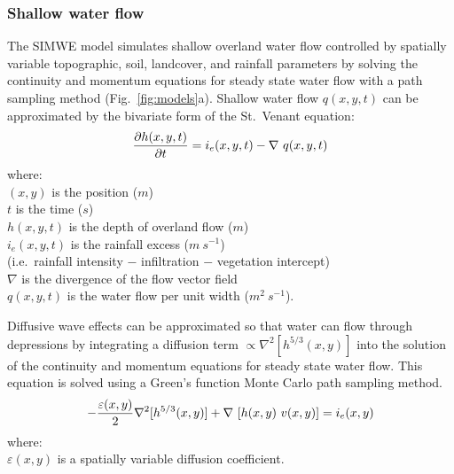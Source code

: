 \documentclass[esurf, manuscript]{copernicus}
\begin{document}

\subsubsection{Shallow water flow}

The SIMWE model
simulates shallow overland water flow
controlled by spatially variable topographic, soil, landcover, and rainfall parameters
by solving the continuity and momentum equations 
for steady state water flow with a path sampling method
(Fig.~\ref{fig:models}a). 
Shallow water flow $q(x,y,t)$ can be approximated by
the bivariate form of the St.~Venant equation:
\begin{equation}
\label{eq:water}
{\partial h(x,y,t) \over \partial t} =
 i_e(x,y,t) - \nabla ~ q(x,y,t)
\end{equation}
{\small
\noindent
where: \\
\noindent
\hspace*{0.5em} $(x,y)$ is the position ($m$)\\
\hspace*{0.5em} $t$ is the time ($s$) \\
\hspace*{0.5em} $h(x,y,t)$ is the depth of overland flow ($m$)\\
\hspace*{0.5em} $i_e(x,y,t)$ is the rainfall excess ($m~s^{-1}$) \\
\hspace*{0.5em} (i.e.~rainfall intensity $-$ infiltration $-$ vegetation intercept)\\
\hspace*{0.5em} $\nabla$ is the divergence of the flow vector field\\
\hspace*{0.5em} $q(x,y,t)$ is the water flow per unit width ($m^2~s^{-1}$). \\
}

Diffusive wave effects can be approximated
so that water can flow through depressions 
by integrating a diffusion term $ \propto \nabla^2 [h^{5/3}(x,y)]$ 
into the solution of the continuity and momentum equations 
for steady state water flow.
This equation is solved using a 
Green's function Monte Carlo path sampling method. 
\begin{equation}
\label{eq:difwater}
-{\varepsilon(x,y)\over 2 }\nabla^2 [h^{5/3}(x,y)]
+\nabla ~ [ h(x,y)~v(x,y)] = i_e(x,y)
\end{equation}
{\small
\noindent
 where: \\
 \noindent
 \hspace*{0.5em} $\varepsilon(x,y)$ is a spatially variable diffusion coefficient. \\
}
\end{document}
